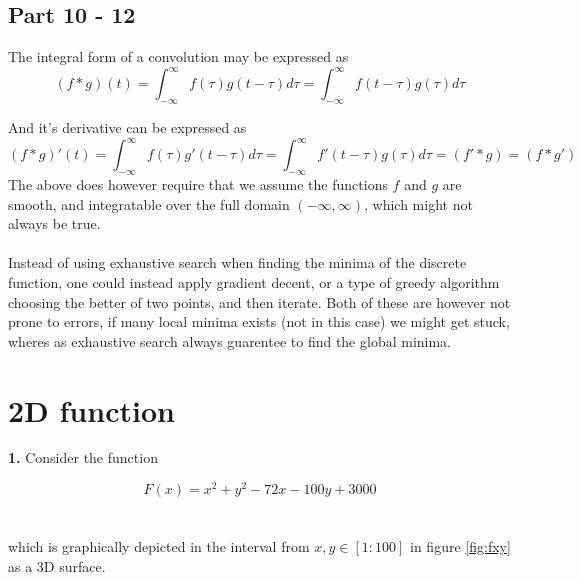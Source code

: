 \documentclass[]{article}
\begin{document}
\subsection*{Part 10 - 12}
The integral form of a convolution may be expressed as
\begin{equation}
	(f * g)(t) = \int_{-\infty}^{\infty} f(\tau)g(t - \tau) d\tau = \int_{-\infty}^{\infty}	f(t - \tau)g(\tau) d\tau
\end{equation}

And it's derivative can be expressed as
\begin{equation}
	(f * g)'(t) = \int_{-\infty}^{\infty} f(\tau)g'(t - \tau) d\tau = \int_{-\infty}^{\infty}	f'(t - \tau)g(\tau) d\tau 
	= (f' * g) = (f * g')
\end{equation}
The above does however require that we assume the functions $f$ and $g$ are smooth, and integratable over the full domain $(-\infty, \infty)$, which might not always be true.\\\\
Instead of using exhaustive search when finding the minima of the discrete function, one could instead apply gradient decent, or a type of greedy algorithm choosing the better of two points, and then iterate. Both of these are however not prone to errors, if many local minima exists (not in this case) we might get stuck, wheres as exhaustive search always guarentee to find the global minima.

\section{2D function}
\textbf{1.} Consider the function 

\begin{equation} 
	F(x) = x^2 + y^2 - 72x -100y + 3000
\end{equation}
\\\\which is graphically depicted in the interval from $x, y \in [1:100]$ in figure \ref{fig:fxy} as a 3D surface.\\\\
\end{document}
